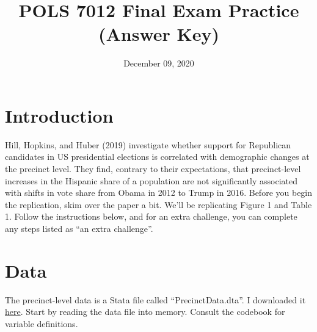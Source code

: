 \documentclass[12pt,halfline,a4paper,]{ouparticle}
\begin{document}
\title{POLS 7012 Final Exam Practice (Answer Key)}

\author{%
\address{University of Georgia}
\and
{}\address{University of Georgia}
}


\date{December 09, 2020}

\keywords{}

\maketitle



\hypertarget{introduction}{%
\section{Introduction}\label{introduction}}

Hill, Hopkins, and Huber (2019) investigate whether support for
Republican candidates in US presidential elections is correlated with
demographic changes at the precinct level. They find, contrary to their
expectations, that precinct-level increases in the Hispanic share of a
population are not significantly associated with shifts in vote share
from Obama in 2012 to Trump in 2016. Before you begin the replication,
skim over the paper a bit. We'll be replicating Figure 1 and Table 1.
Follow the instructions below, and for an extra challenge, you can
complete any steps listed as ``an extra challenge''.

\hypertarget{data}{%
\section{Data}\label{data}}

The precinct-level data is a Stata file called ``PrecinctData.dta''. I
downloaded it
\href{https://dataverse.harvard.edu/dataset.xhtml?persistentId=doi:10.7910/DVN/J5GCZQ}{here}.
Start by reading the data file into memory. Consult the codebook for
variable definitions.
\end{document}

